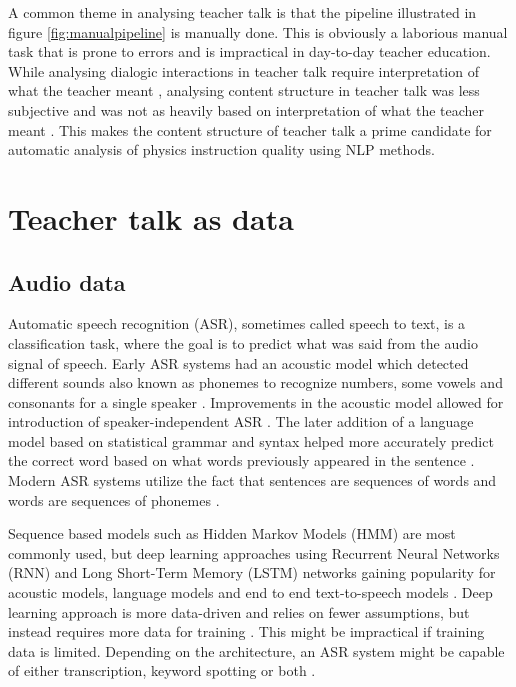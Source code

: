 \documentclass[utf8,english]{gradu3}
\begin{document}
A common theme in analysing teacher talk is that the pipeline illustrated in figure \ref{fig:manualpipeline} is manually done. This is obviously a laborious manual task that is prone to errors and is impractical in day-to-day teacher education. While analysing dialogic interactions in teacher talk require interpretation of what the teacher meant \parencite{viiriTeacherTalkPatterns2006}, analysing content structure in teacher talk was less subjective and was not as heavily based on interpretation of what the teacher meant \parencite{helaakoskiContentContentStructure2014}. This makes the content structure of teacher talk a prime candidate for automatic analysis of physics instruction quality using NLP methods. 




\chapter{Teacher talk as data}
\label{chap:speech}
\section{Audio data}
Automatic speech recognition (ASR), sometimes called speech to text, is a classification task, where the goal is to predict what was said from the audio signal of speech. Early ASR systems had an acoustic model which detected different sounds also known as phonemes to recognize numbers, some vowels and consonants for a single speaker \parencite{juangAutomaticSpeechRecognition2005}. Improvements in the acoustic model allowed for introduction of speaker-independent ASR \parencite{benzeghibaAutomaticSpeechRecognition2007,juangAutomaticSpeechRecognition2005}. The later addition of a language model based on statistical grammar and syntax helped more accurately predict the correct word based on what words previously appeared in the sentence \parencite{juangAutomaticSpeechRecognition2005}. Modern ASR systems utilize the fact that sentences are sequences of words and words are sequences of phonemes \parencite{bengioWordEmbeddingsSpeech2014}. 

Sequence based models such as Hidden Markov Models (HMM) are most commonly used, but deep learning approaches using Recurrent Neural Networks (RNN) and Long Short-Term Memory (LSTM) networks gaining popularity for acoustic models, language models and end to end text-to-speech models \parencite{bengioWordEmbeddingsSpeech2014,enarviAutomaticSpeechRecognition2017}. Deep learning approach is more data-driven and relies on fewer assumptions, but instead requires more data for training \parencite{bengioWordEmbeddingsSpeech2014}. This might be impractical if training data is limited. Depending on the architecture, an ASR system might be capable of either transcription, keyword spotting or both \parencite{juangAutomaticSpeechRecognition2005,enarviAutomaticSpeechRecognition2017}.
\end{document}
